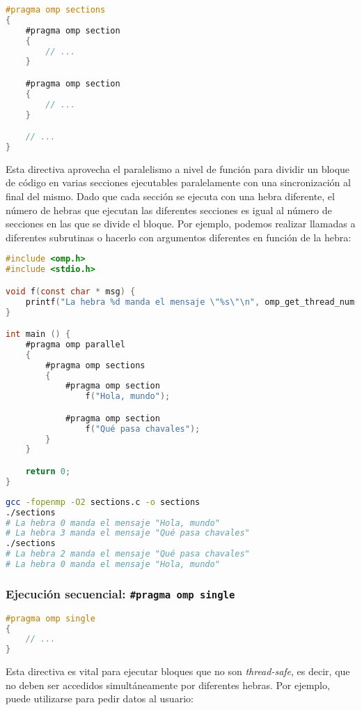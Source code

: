 \begin{lstlisting}[language=C]
#pragma omp sections
{
	#pragma omp section
	{
		// ...
	}

	#pragma omp section
	{
		// ...
	}

	// ...
}
\end{lstlisting}

Esta directiva aprovecha el paralelismo a nivel de función para dividir un bloque de código en varias secciones ejecutables paralelamente con una sincronización al final del mismo.
Dado que cada sección se ejecuta con una hebra diferente, el número de hebras que ejecutan las diferentes secciones es igual al número de secciones en las que se divide el bloque.
Por ejemplo, podemos realizar llamadas a diferentes subrutinas o hacerlo con argumentos diferentes en función de la hebra:

\begin{lstlisting}[language=C]
#include <omp.h>
#include <stdio.h>

void f(const char * msg) {
	printf("La hebra %d manda el mensaje \"%s\"\n", omp_get_thread_num(), msg);
}

int main () {
	#pragma omp parallel
	{
		#pragma omp sections
		{
			#pragma omp section
				f("Hola, mundo");

			#pragma omp section
				f("Qué pasa chavales");
		}
	}

	return 0;
}
\end{lstlisting}

\begin{lstlisting}[language=sh]
gcc -fopenmp -O2 sections.c -o sections
./sections
# La hebra 0 manda el mensaje "Hola, mundo"
# La hebra 3 manda el mensaje "Qué pasa chavales"
./sections
# La hebra 2 manda el mensaje "Qué pasa chavales"
# La hebra 0 manda el mensaje "Hola, mundo"
\end{lstlisting}

\subsubsection{Ejecución secuencial: \texttt{\#pragma omp single}}

\begin{lstlisting}[language=C]
#pragma omp single
{
	// ...
}
\end{lstlisting}

Esta directiva es vital para ejecutar bloques que no son \textit{thread-safe}, es decir, que no deben ser accedidos simultáneamente por diferentes hebras.
Por ejemplo, puede utilizarse para pedir datos al usuario:

